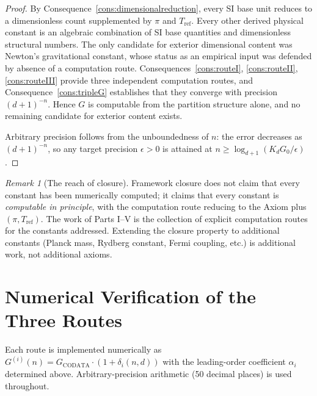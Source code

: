 \documentclass[11pt,twocolumn,a4paper]{article}
\theoremstyle{axiomstyle}
\theoremstyle{conseqstyle}
\theoremstyle{definition}
\theoremstyle{remark}
\newtheorem*{remark}{Remark}
\begin{document}
\begin{proof}
By Consequence~\ref{cons:dimensionalreduction}, every SI base unit reduces to a dimensionless count supplemented by $\pi$ and $T_{\mathrm{ref}}$. Every other derived physical constant is an algebraic combination of SI base quantities and dimensionless structural numbers. The only candidate for exterior dimensional content was Newton's gravitational constant, whose status as an empirical input was defended by absence of a computation route. Consequences~\ref{cons:routeI}, \ref{cons:routeII}, \ref{cons:routeIII} provide three independent computation routes, and Consequence~\ref{cons:tripleG} establishes that they converge with precision $(d+1)^{-n}$. Hence $G$ is computable from the partition structure alone, and no remaining candidate for exterior content exists.

Arbitrary precision follows from the unboundedness of $n$: the error decreases as $(d+1)^{-n}$, so any target precision $\epsilon>0$ is attained at $n\geq\log_{d+1}(K_{d}G_{0}/\epsilon)$.
\end{proof}

\begin{remark}[The reach of closure]
Framework closure does not claim that every constant has been numerically computed; it claims that every constant is \emph{computable in principle}, with the computation route reducing to the Axiom plus $(\pi,T_{\mathrm{ref}})$. The work of Parts I--V is the collection of explicit computation routes for the constants addressed. Extending the closure property to additional constants (Planck mass, Rydberg constant, Fermi coupling, etc.) is additional work, not additional axioms.
\end{remark}

\section{Numerical Verification of the Three Routes}
\label{sec:Gnumerical}

Each route is implemented numerically as $G^{(i)}(n)=G_{\mathrm{CODATA}}\cdot(1+\delta_{i}(n,d))$ with the leading-order coefficient $\alpha_{i}$ determined above. Arbitrary-precision arithmetic (50 decimal places) is used throughout.
\end{document}
